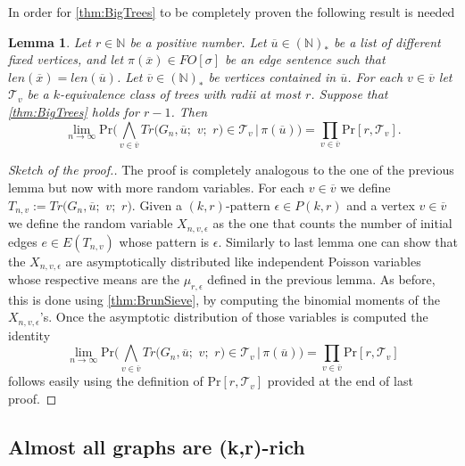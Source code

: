 \documentclass[12pt,notitlepage,a4paper]{article}
\newtheorem{lemma}{Lemma}[section]
\theoremstyle{definition}
\newcommand{\N}{\mathbb{N}}
\newcommand{\Ln}{\lim\limits_{n\to \infty}}
\begin{document}
	In order for \cref{thm:BigTrees} to be completely proven the following result is needed
	
	\begin{lemma}
		Let $r\in \N$ be a positive number.
		Let $\overline{u}\in (\N)_*$ be a list of different fixed 
		vertices, and let $\pi(\overline{x})\in FO[\sigma]$ be an
		edge sentence such that 
		$len(\overline{x})=len(\overline{u})$.
		Let $\overline{v}\in (\N)_*$ be vertices contained
		in $\overline{u}$. For each $v\in \overline{v}$
		let $\mathcal{T}_v$ be a $k$-equivalence class
		of trees with radii	at most $r$. Suppose that
		\cref{thm:BigTrees} holds for $r-1$. Then
		\[
		\Ln \mathrm{Pr}\big( \bigwedge_{v\in \overline{v}} 
		Tr\big(G_n, \overline{u};\,\,v;\,\,r\big)\in \mathcal{T}_v 
		\, | \, \pi(\overline{u})
		\big)= \prod_{v\in \overline{v}} \mathrm{Pr}[r,\mathcal{T}_v]. \]	 
	\end{lemma}
	\begin{proof}[Sketch of the proof.]
		The proof is completely analogous to the one 
		of the previous lemma but now with more 
		random variables. For each $v\in \overline{v}$ we define
		$T_{n,v}:=Tr\big(G_n, \overline{u};\,\,v;\,\,r\big)$.
		Given a $(k,r)$-pattern $\epsilon\in P(k,r)$ and a vertex
		$v\in \overline{v}$ we define the random variable 
		$X_{n,v,\epsilon}$ as the one that counts the number of initial
		edges $e\in E(T_{n,v})$ whose pattern is $\epsilon$. Similarly to last lemma
		one can show that the $X_{n,v,\epsilon}$ are asymptotically distributed
		like independent Poisson variables whose respective means are the
		$\mu_{r,\epsilon}$ defined in the previous lemma. As before, this is done using 
		\cref{thm:BrunSieve}, by computing the binomial moments of the $X_{n,v,\epsilon}$'s.
		Once the asymptotic distribution of those variables is computed the identity
		\[\Ln \mathrm{Pr}\big( \bigwedge_{v\in \overline{v}} 
		Tr\big(G_n, \overline{u};\,\,v;\,\,r\big)\in \mathcal{T}_v 
		\, | \, \pi(\overline{u})
		\big)= \prod_{v\in \overline{v}} \mathrm{Pr}[r,\mathcal{T}_v]
		\]
		follows easily using the definition of $\mathrm{Pr}[r,\mathcal{T}_v]$ 
		provided at the end of last proof. 
	\end{proof}

	\subsection{Almost all graphs are (k,r)-rich}
	
\end{document}
